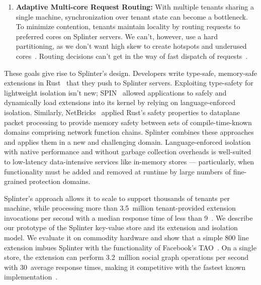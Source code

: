 \begin{enumerate}
\item {\bf Adaptive Multi-core Request Routing:}
  With multiple tenants sharing a single machine, synchronization over tenant
    state can become a bottleneck.
  To minimize contention, tenants maintain locality by routing requests to
    preferred cores on Splinter servers.
  We can't, however, use a hard partitioning, as we don't want high skew to
    create hotspots and underused cores~\cite{zygos}.
    Routing decisions can't get in the way of fast dispatch of requests~\cite{ix}.

\end{enumerate}

These goals give rise to Splinter's design.
Developers write type-safe, memory-safe extensions in Rust~\cite{rust}
that they push to Splinter servers.
Exploiting type-safety for lightweight isolation isn't new;
SPIN~\cite{spin} allowed applications to safely and dynamically load
extensions into its kernel by relying on language-enforced isolation.
Similarly, NetBricks~\cite{netbricks-2016} applied Rust's safety
properties to dataplane packet processing to
  provide memory safety between sets of compile-time-known domains comprising
  network function chains.
Splinter combines these approaches and applies them in a new and challenging domain.
Language-enforced isolation with native performance and without garbage
  collection overheads is well-suited to low-latency data-intensive services
  like in-memory stores --- particularly, when functionality must be added and removed at
  runtime by large numbers of fine-grained protection domains.

Splinter's approach allows it to scale to support thousands of tenants per
  machine, while processing more than
  3.5~million tenant-provided extension invocations per second with a median
  response time of less than 9~\us.
We describe our prototype of the Splinter key-value store and its
  extension and isolation model.
We evaluate it on commodity hardware and show that a simple 800
  line extension imbues Splinter with the functionality of Facebook's
  TAO~\cite{tao-2013}.
On a single store, the extension can perform 3.2~million social graph
  operations per second with 30~\us average response times, making it
  competitive with the fastest known implementation~\cite{farm-2014}.


